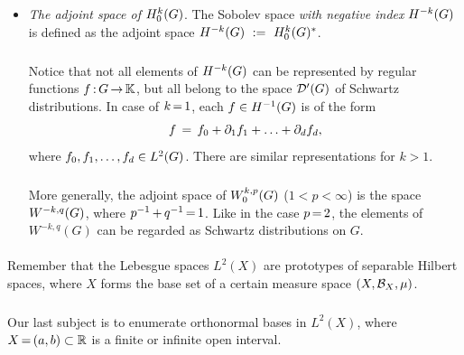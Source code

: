 \documentclass[11pt,twoside]{article}
\begin{document}
\begin{itemize}[leftmargin=15pt,itemsep=6pt]
\item[8.] \textit{The adjoint space of $\HN{k}{\G}$}.
The Sobolev space \textit{with negative index} $H^{-k}(\G)$
is defined as the adjoint space
$H^{-k}(\G) \, \eqdef \, \HN{k}{\G}^*$.

\subparagraph*{}
Notice that not all elements of $H^{-k}(\G)$ can be represented
by regular functions $f\:\G \xto \F$,
but all belong to the space $\D'(\G)$ of Schwartz distributions.
In case of $k \eq 1$,
each $f \in H^{-1}(\G)$ is of the form
\[
f \= f_0 + \partial_1 f_1 + \ldots + \partial_d f_d,
\]
where $f_0,f_1,\ldots,f_d \in \Lh$.
There are similar representations for $k > 1$.

\subparagraph*{}
More generally,
the adjoint space of $\WN{k,p}{\G}$ ($1<p<\infty$) 
is the space $W^{-k,q}(\G)$,
where $p^{-1} \,{+}\, q^{-1} \eq 1$.
Like in the case $p \eq 2$,
the elements of $W^{-k,q}(G)$ can be regarded as Schwartz distributions on $G$.
\end{itemize}

\paragraph*{} %
Remember that
the Lebesgue spaces $L^2(X)$ are prototypes of separable Hilbert spaces,
where $X$ forms the base set of a certain measure space $(X,\Borel{X},\mu)$.

\subparagraph*{}
Our last subject is to enumerate orthonormal bases in $L^2(X)$,
where $X \eq (a,b) \subset \R$ is a finite or infinite open interval.
\end{document}
